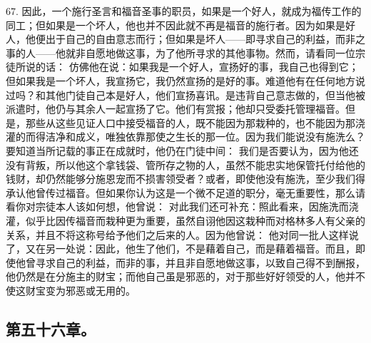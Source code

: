 67. 因此，一个施行圣言和福音圣事的职员，如果是一个好人，就成为福传工作的同工；但如果是一个坏人，他也并不因此就不再是福音的施行者。因为如果是好人，他便出于自己的自由意志而行；但如果是坏人——即寻求自己的利益，而非之事的人——他就非自愿地做这事，为了他所寻求的其他事物。然而，请看同一位宗徒所说的话： 仿佛他在说：如果我是一个好人，宣扬好的事，我自己也得到它；但如果我是一个坏人，我宣扬它，我仍然宣扬的是好的事。难道他有在任何地方说过吗？和其他门徒自己本是好人，他们宣扬喜讯。是违背自己意志做的，但当他被派遣时，他仍与其余人一起宣扬了它。他们有赏报；他却只受委托管理福音。但是，那些从这些见证人口中接受福音的人，既不能因为那栽种的，也不能因为那浇灌的而得洁净和成义，唯独依靠那使之生长的那一位。因为我们能说没有施洗么？要知道当所记载的事正在成就时，他仍在门徒中间： 我们是否要认为，因为他还没有背叛，所以他这个拿钱袋、管所存之物的人，虽然不能忠实地保管托付给他的钱财，却仍然能够分施恩宠而不损害领受者？或者，即使他没有施洗，至少我们得承认他曾传过福音。但如果你认为这是一个微不足道的职分，毫无重要性，那么请看你对宗徒本人该如何想，他曾说： 对此我们还可补充：照此看来，因施洗而浇灌，似乎比因传福音而栽种更为重要，虽然自诩他因这栽种而对格林多人有父亲的关系，并且不将这称号给予他们之后来的人。因为他曾说： 他对同一批人这样说了，又在另一处说：因此，他生了他们，不是藉着自己，而是藉着福音。而且，即使他曾寻求自己的利益，而非的事，并且非自愿地做这事，以致自己得不到酬报，他仍然是在分施主的财宝；而他自己虽是邪恶的，对于那些好好领受的人，他并不使这财宝变为邪恶或无用的。\par


\subsection{第五十六章。}

